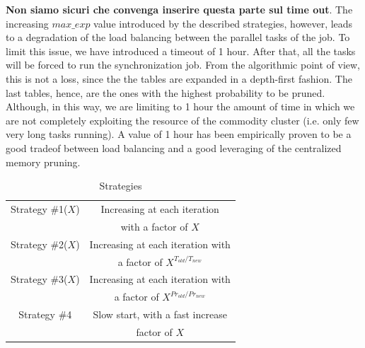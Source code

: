 \textbf{Non siamo sicuri che convenga inserire questa parte sul time out}.
The increasing $max\_exp$ value introduced by the described strategies, however, leads to a degradation of the load balancing between the parallel tasks of the job. To limit this issue, we have introduced a timeout of 1 hour. After that, all the tasks will be forced to run the synchronization job. From the algorithmic point of view, this is not a loss, since the the tables are expanded in a depth-first fashion. The last tables, hence, are the ones with the highest probability to be pruned. Although, in this way, we are limiting to 1 hour the amount of time in which we are not completely exploiting the resource of the commodity cluster (i.e. only few very long tasks running). A value of 1 hour has been empirically proven to be a good tradeof between load balancing and a good leveraging of the centralized memory pruning.

\begin{table}
\begin{center}
\caption{Strategies}
\label{table_strategies}
\begin{tabular}{|c|c|}
\hline
Strategy \#1($X$)  & Increasing at each iteration      \\ 
                   & with a factor of $X$               \\ \hline

Strategy \#2($X$)  & Increasing at each iteration with \\
                   & a factor of $X^{T_{old} / T_{new}}$                   \\ \hline


Strategy \#3($X$) & Increasing at each iteration with \\
                   & a factor of $X^{Pr_{old} / Pr_{new}}$                    \\ \hline
                   Strategy \#4       & Slow start, with a fast increase                      \\ 
     & factor of   $X$                     \\ \hline
            
\end{tabular}
\end{center}
\end{table}


